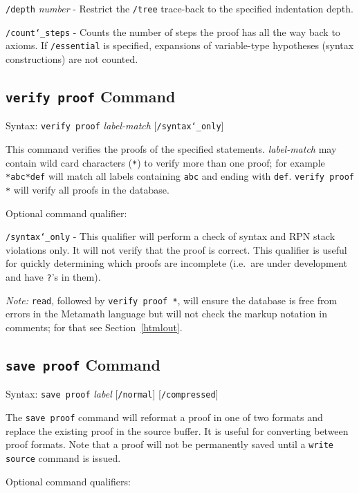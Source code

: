     \texttt{/depth} {\em number} - Restrict the \texttt{/tree} trace-back to the
        specified indentation depth.

    \texttt{/count{\char`\_}steps} - Counts the number of steps the proof has
       all the way back to axioms.  If \texttt{/essential} is specified,
       expansions of variable-type hypotheses (syntax constructions) are not counted.

\subsection{\texttt{verify proof} Command}
Syntax:  \texttt{verify proof} {\em label-match} [\texttt{/syntax{\char`\_}only}]

This command verifies the proofs of the specified statements.  {\em
label-match} may contain wild card characters (\texttt{*}) to verify
more than one proof; for example \verb/*abc*def/ will match all labels
containing \texttt{abc} and ending with \texttt{def}.  \texttt{verify
proof *} will verify all proofs in the database.

Optional command qualifier:

    \texttt{/syntax{\char`\_}only} - This qualifier will perform a check of syntax
        and RPN
        stack violations only.  It will not verify that the proof is
        correct.  This qualifier is useful for quickly determining which
        proofs are incomplete (i.e.\ are under development and have \texttt{?}'s
        in them).

{\em Note:} \texttt{read}, followed by \texttt{verify proof *}, will ensure
 the database is free
from errors in the Metamath language but will not check the markup notation
in comments; for that
see Section~\ref{htmlout}.

\subsection{\texttt{save proof} Command}
Syntax:  \texttt{save proof} {\em label} [\texttt{/normal}]
   [\texttt{/compressed}]

The \texttt{save proof} command will reformat a proof in one of two formats and
replace the existing proof in the source buffer.  It is useful for
converting between proof formats.  Note that a proof will not be
permanently saved until a \texttt{write source} command is issued.

Optional command qualifiers:

